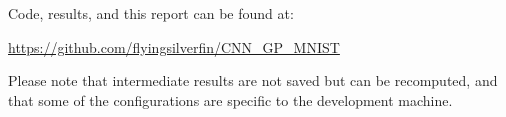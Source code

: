 \documentclass{article}
\begin{document}
Code, results, and this report can be found at:

\url{https://github.com/flyingsilverfin/CNN_GP_MNIST}

Please note that intermediate results are not saved but can be recomputed, and that some of the configurations are specific to the development machine. %







\appendix
\end{document}
